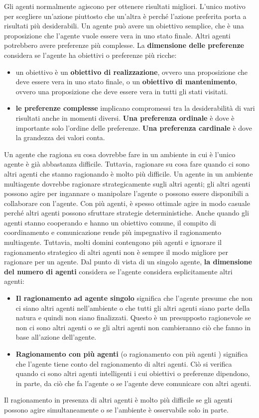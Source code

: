\documentclass[a4paper]{extarticle}
\begin{document}
Gli agenti normalmente agiscono per ottenere risultati migliori. L'unico motivo per scegliere un'azione piuttosto che un'altra è perché l'azione preferita porta a risultati più desiderabili. Un agente può avere un obiettivo semplice, che è una proposizione che l'agente vuole essere vera in uno stato finale. Altri agenti potrebbero avere preferenze più complesse. La \textbf{dimensione delle preferenze} considera se l'agente ha obiettivi o preferenze più ricche:

\begin{itemize}
\item un obiettivo è un \textbf{obiettivo di realizzazione}, ovvero una proposizione che deve essere vera in uno stato finale, o un \textbf{obiettivo di mantenimento}, ovvero una proposizione che deve essere vera in tutti gli stati visitati.
\item \textbf{ le preferenze complesse} implicano compromessi tra la desiderabilità di vari risultati anche in momenti diversi. \textbf{Una preferenza ordinale} è dove è importante solo l'ordine delle preferenze. \textbf{Una preferenza cardinale} è dove la grandezza dei valori conta.
\end{itemize}

Un agente che ragiona su cosa dovrebbe fare in un ambiente in cui è l'unico agente è già abbastanza difficile. Tuttavia, ragionare su cosa fare quando ci sono altri agenti che stanno ragionando è molto più difficile. Un agente in un ambiente multiagente dovrebbe ragionare strategicamente sugli altri agenti; gli altri agenti possono agire per ingannare o manipolare l'agente o possono essere disponibili a collaborare con l'agente. Con più agenti, è spesso ottimale agire in modo casuale perché altri agenti possono sfruttare strategie deterministiche. Anche quando gli agenti stanno cooperando e hanno un obiettivo comune, il compito di coordinamento e comunicazione rende più impegnativo il ragionamento multiagente. Tuttavia, molti domini contengono più agenti e ignorare il ragionamento strategico di altri agenti non è sempre il modo migliore per ragionare per un agente. Dal punto di vista di un singolo agente, \textbf{la dimensione del numero di agenti} considera se l'agente considera esplicitamente altri agenti:
\begin{itemize}
\item \textbf{Il ragionamento ad agente singolo} significa che l'agente presume che non ci siano altri agenti nell'ambiente o che tutti gli altri agenti siano parte della natura e quindi non siano finalizzati. Questo è un presupposto ragionevole se non ci sono altri agenti o se gli altri agenti non cambieranno ciò che fanno in base all'azione dell'agente.

\item \textbf{Ragionamento con più agenti} (o ragionamento con più agenti ) significa che l'agente tiene conto del ragionamento di altri agenti. Ciò si verifica quando ci sono altri agenti intelligenti i cui obiettivi o preferenze dipendono, in parte, da ciò che fa l'agente o se l'agente deve comunicare con altri agenti.
\end{itemize}
Il ragionamento in presenza di altri agenti è molto più difficile se gli agenti possono agire simultaneamente o se l'ambiente è osservabile solo in parte.
\end{document}
